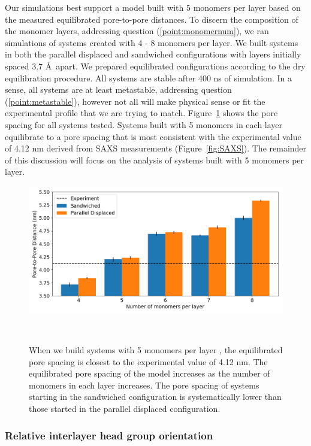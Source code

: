 \documentclass[journal=jpcbfk,manusciprt=article]{achemso}
\begin{document}
  Our simulations best support a model built with 5 monomers per layer based on
  the measured equilibrated pore-to-pore distances. To discern the composition of
  the monomer layers, addressing question (\ref{point:monomernum}), we ran
  simulations of systems created with 4 - 8 monomers per layer. We built systems
  in both the parallel displaced and sandwiched configurations with layers
  initially spaced 3.7 \AA~apart. We prepared equilibrated configurations
  according to the dry equilibration procedure. All systems are stable after 400
  ns of simulation. In a sense, all systems are at least metastable, addressing
  question (\ref{point:metastable}), however not all will make physical sense or fit
  the experimental profile that we are trying to match. Figure~\ref{fig:p2p}
  shows the pore spacing for all systems tested. Systems built with 5 monomers in
  each layer equilibrate to a pore spacing that is most consistent with the
  experimental value of 4.12 nm derived from SAXS measurements
  (Figure~\ref{fig:SAXS}). The remainder of this discussion will focus on the
  analysis of systems built with 5 monomers per layer.

  \begin{figure}
	\centering
	\includegraphics[width=\linewidth]{p2p.png}
	\caption{When we build systems with 5 monomers per layer , the
		equilibrated pore spacing is closest to the experimental value of 4.12 nm. The
			equilibrated pore spacing of the model increases as the number of monomers in
			each layer increases. The pore spacing of systems starting in the sandwiched
			configuration is systematically lower than those started in the parallel
			displaced configuration.}~\label{fig:p2p}
  \end{figure}  

  \subsubsection{Relative interlayer head group orientation}
\end{document}
